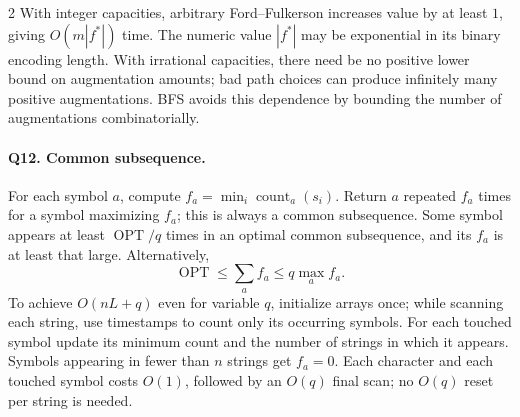 \documentclass[10pt]{article}
\theoremstyle{definition}
\newcommand{\OPT}{\operatorname{OPT}}
\begin{document}
\begin{multicols*}{2}
With integer capacities, arbitrary Ford--Fulkerson increases value by at
least $1$, giving $O(m|f^*|)$ time.  The numeric value $|f^*|$ may be
exponential in its binary encoding length.  With irrational capacities,
there need be no positive lower bound on augmentation amounts; bad path
choices can produce infinitely many positive augmentations.  BFS avoids
this dependence by bounding the number of augmentations combinatorially.

\paragraph{Q12. Common subsequence.}
For each symbol $a$, compute $f_a=\min_i\operatorname{count}_a(s_i)$.
Return $a$ repeated $f_a$ times for a symbol maximizing $f_a$; this is
always a common subsequence.  Some symbol appears at least $\OPT/q$ times
in an optimal common subsequence, and its $f_a$ is at least that large.
Alternatively,
\[
\OPT\le\sum_a f_a\le q\max_a f_a.
\]
To achieve $O(nL+q)$ even for variable $q$, initialize arrays once; while
scanning each string, use timestamps to count only its occurring symbols.
For each touched symbol update its minimum count and the number of strings
in which it appears.  Symbols appearing in fewer than $n$ strings get
$f_a=0$.  Each character and each touched symbol costs $O(1)$, followed
by an $O(q)$ final scan; no $O(q)$ reset per string is needed.


\end{multicols*}
\end{document}
